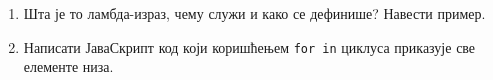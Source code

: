 \documentclass[a4paper]{article}
\begin{document}
\begin{enumerate}
\hrulefill



\item Шта је то ламбда-израз, чему служи и како се дефинише? Навести пример. \hrulefill

\hrulefill

\hrulefill

\hrulefill

\hrulefill

\hrulefill

\hrulefill

\hrulefill

\hrulefill

\hrulefill

\hrulefill


\item Написати ЈаваСкрипт код који коришћењем \verb|for in| циклуса приказује све елементе низа. 

\hrulefill

\hrulefill

\hrulefill

\hrulefill

\hrulefill

\hrulefill

\hrulefill

\hrulefill

\hrulefill

\hrulefill


\end{enumerate}
\end{document}
